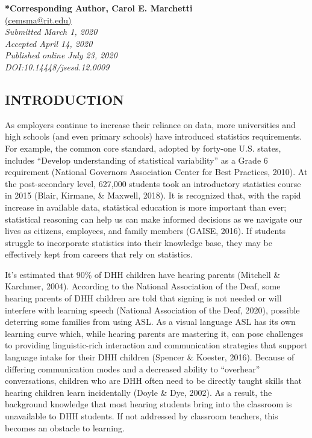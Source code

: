 \documentclass[11.5pt]{sig-alternate} %
\begin{document}

\textbf{*Corresponding Author, Carol E. Marchetti}\\
\href{mailto: cemsma@rit.edu}{(cemsma@rit.edu)} \\
\textit{Submitted March 1, 2020 } \\
\textit{Accepted April 14, 2020} \\
\textit{Published online July 23, 2020} \\
\textit{DOI:10.14448/jsesd.12.0009} \\
\pagebreak
\clearpage

\begin{large}
\section*{INTRODUCTION}

As employers continue to increase their reliance on data, more universities and high schools (and even primary schools) have introduced statistics requirements. For example, the common core standard, adopted by forty-one U.S. states, includes “Develop understanding of statistical variability” as a Grade 6 requirement (National Governors Association Center for Best Practices, 2010). At the post-secondary level, 627,000 students took an introductory statistics course in 2015 (Blair, Kirmane, \& Maxwell, 2018). It is recognized that, with the rapid increase in available data, statistical education is more important than ever; statistical reasoning can help us can make informed decisions as we navigate our lives as citizens, employees, and family members (GAISE, 2016). If students struggle to incorporate statistics into their knowledge base, they may be effectively kept from careers that rely on statistics.

It’s estimated that 90\% of DHH children have hearing parents (Mitchell \& Karchmer, 2004). According to the National Association of the Deaf, some hearing parents of DHH children are told that signing is not needed or will interfere with learning speech (National Association of the Deaf, 2020), possible deterring some families from using ASL. As a visual language ASL has its own learning curve which, while hearing parents are mastering it, can pose challenges to providing linguistic-rich interaction and communication strategies that support language intake for their DHH children (Spencer \& Koester, 2016). Because of differing communication modes and a decreased ability to “overhear” conversations, children who are DHH often need to be directly taught skills that hearing children learn incidentally (Doyle \& Dye, 2002). As a result, the background knowledge that most hearing students bring into the classroom is unavailable to DHH students. If not addressed by classroom teachers, this becomes an obstacle to learning. 


\end{large}
\end{document}
